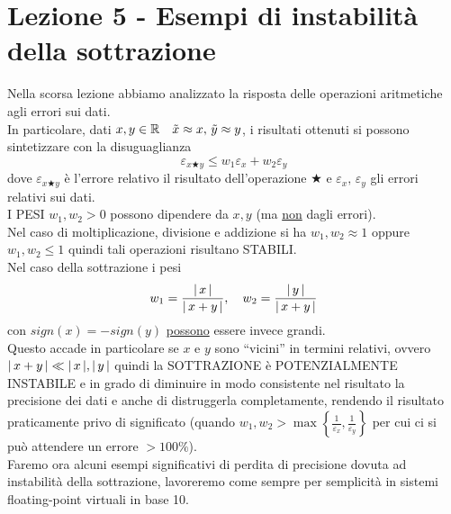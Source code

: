 \documentclass[12pt]{article}
\DeclarePairedDelimiter{\abs}{\lvert}{\rvert}
\begin{document}
\section{Lezione 5 - Esempi di instabilità della sottrazione}
Nella scorsa lezione abbiamo analizzato la risposta delle operazioni aritmetiche agli errori sui dati. \\
In particolare, dati $x, y \in \mathbb{R} \quad \Tilde{x} \approx x,\, \Tilde{y}\approx y$, i risultati ottenuti si possono sintetizzare con la disuguaglianza 
\[\varepsilon_{x \bigstar y} \le w_1\varepsilon_x + w_2\varepsilon_y\] 
dove $\varepsilon_{x \bigstar y}$ è l’errore relativo il risultato dell'operazione $\bigstar$ e $\varepsilon_x,\,\varepsilon_y$ gli errori relativi sui dati. \\
I PESI $w_1, w_2 > 0$ possono dipendere da $x,y$ (ma \uline{non} dagli errori).\\
Nel caso di moltiplicazione, divisione e addizione si ha $w_1, w_2 \approx 1$ oppure $w_1, w_2 \le 1$ quindi tali operazioni risultano STABILI.\\
Nel caso della sottrazione i pesi \[w_1 = \frac{\abs{\,x\,}}{\abs{\,x + y\,}}, \quad w_2 = \frac{\abs{\,y\,}}{\abs{\,x + y\,}}\] con $sign(x)=-sign(y)$ \uline{possono} essere invece grandi.\\
Questo accade in particolare se $x$ e $y$ sono “vicini” in termini relativi, ovvero $\abs{\,x+y\,} \ll \abs{\,x\,},\abs{\,y\,}$ quindi la SOTTRAZIONE è POTENZIALMENTE INSTABILE e in grado di diminuire in modo consistente nel risultato la precisione dei dati e anche di distruggerla completamente, rendendo il risultato praticamente privo di significato (quando $w_1,w_2 > \max \left \{ \frac{1}{\varepsilon_x},\frac{1}{\varepsilon_y} \right \}$ per cui ci si può attendere un errore $> 100\%$).\\
Faremo ora alcuni esempi significativi di perdita di precisione dovuta ad instabilità della sottrazione, lavoreremo come sempre per semplicità in sistemi floating-point virtuali in base 10.
\end{document}
